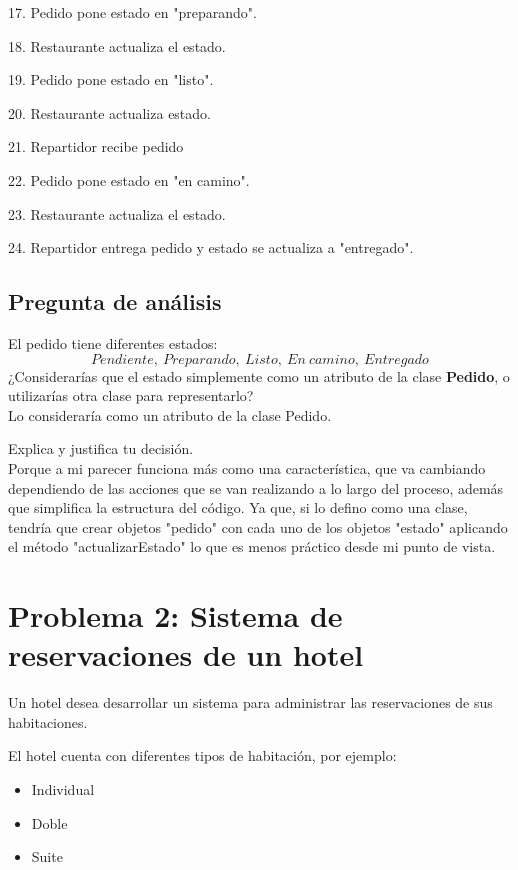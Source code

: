 \documentclass[12pt]{article}
\begin{document}
17. Pedido pone estado en "preparando".

18. Restaurante actualiza el estado.

19. Pedido pone estado en "listo".

20. Restaurante actualiza estado.

21. Repartidor recibe pedido

22. Pedido pone estado en "en camino".

23. Restaurante actualiza el estado. 

24. Repartidor entrega pedido y estado se actualiza a "entregado".

\subsection*{Pregunta de análisis}

El pedido tiene diferentes estados:
\[
Pendiente,\ Preparando,\ Listo, \ En \ camino, \ Entregado
\]
¿Considerarías que el estado simplemente como un atributo de la clase \textbf{Pedido}, o utilizarías otra clase para representarlo? \\

Lo consideraría como  un atributo de la clase Pedido.

Explica y justifica tu decisión. \\

Porque a mi parecer funciona más como una característica, que va cambiando dependiendo de las acciones que se van realizando a lo largo del proceso, además que simplifica la estructura del código. Ya que, si lo defino como una clase, tendría que crear objetos "pedido" con cada uno de los objetos "estado" aplicando el método "actualizarEstado" lo que es menos práctico desde mi punto de vista.

\vspace{1cm}

\section*{Problema 2: Sistema de reservaciones de un hotel}
Un hotel desea desarrollar un sistema para administrar las reservaciones de sus habitaciones.

El hotel cuenta con diferentes tipos de habitación, por ejemplo:

\begin{itemize}
  \item Individual
  \item Doble
  \item Suite
\end{itemize}
\end{document}
